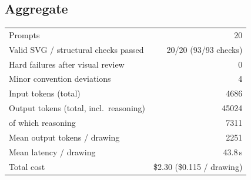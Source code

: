 \documentclass[11pt,a4paper]{article}
\begin{document}
\subsection{Aggregate}
\begin{center}
\begin{tabular}{lr}
\toprule
Prompts & 20 \\
Valid SVG / structural checks passed & 20/20 \quad (93/93 checks) \\
Hard failures after visual review & 0 \\
Minor convention deviations & 4 \\
Input tokens (total) & 4686 \\
Output tokens (total, incl.\ reasoning) & 45024 \\
\quad of which reasoning & 7311 \\
Mean output tokens / drawing & 2251 \\
Mean latency / drawing & 43.8\,s \\
Total cost & \$2.30 \quad (\$0.115 / drawing) \\
\bottomrule
\end{tabular}
\end{center}
\end{document}
